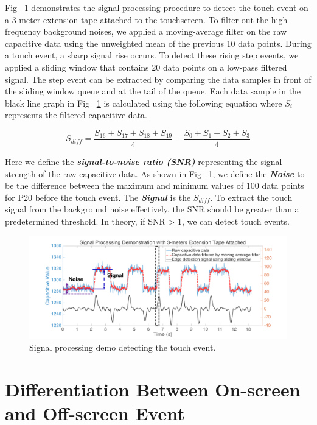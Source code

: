 Fig ~\ref{fig:processing} demonstrates the signal processing procedure to detect the touch event on a 3-meter extension tape attached to the touchscreen. To filter out the high-frequency background noises, we applied a moving-average filter on the raw capacitive data using the unweighted mean of the previous 10 data points. During a touch event, a sharp signal rise occurs. To detect these rising step events, we applied a sliding window that contains 20 data points on a low-pass filtered signal. The step event can be extracted by comparing the data samples in front of the sliding window queue and at the tail of the queue. Each data sample in the black line graph in Fig ~\ref{fig:processing} is calculated using the following equation where $S_{i}$ represents the filtered capacitive data. 

\begin{equation}
    S_{diff} = \frac{S_{16} + S_{17} + S_{18} + S_{19}}{4}  - \frac{S_{0} + S_{1} + S_{2} + S_{3}}{4}
\end{equation}

Here we define the \textbf{\textit{signal-to-noise ratio (SNR)}} representing the signal strength of the raw capacitive data. As shown in Fig ~\ref{fig:processing}, we define the \textbf{\textit{Noise}} to be the difference between the maximum and minimum values of 100 data points for P20 before the touch event. The \textbf{\textit{Signal}} is the $S_{diff}$. To extract the touch signal from the background noise effectively, the SNR should be greater than a predetermined threshold. In theory, if SNR > 1, we can detect touch events. 

\begin{figure}[ht]
    \centering
      \includegraphics[width=0.95\columnwidth]{figures/processing.png}
      \setlength{\belowcaptionskip}{-8pt}
      \caption{Signal processing demo  detecting the touch event.}
      \label{fig:processing}
\end{figure}

\section{Differentiation Between On-screen and Off-screen Event}

